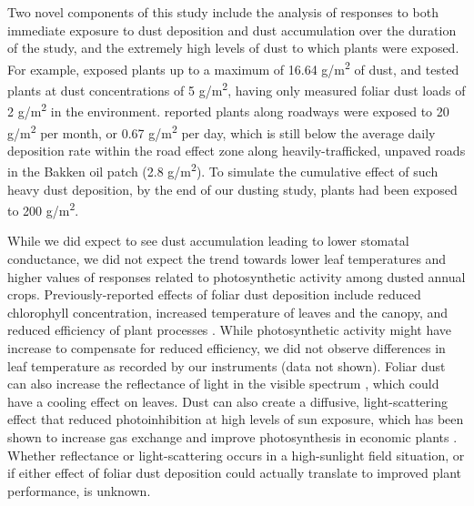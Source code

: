 \documentclass{svjour3}
\begin{document}
Two novel components of this study include the analysis of responses to both immediate exposure to dust deposition and dust accumulation over the duration of the study, and the extremely high levels of dust to which plants were exposed. 
For example, \citet{bao2015} exposed plants up to a maximum of 16.64 g/m\textsuperscript{2} of dust, and \citet{thompson1984} tested plants at dust concentrations of 5 g/m\textsuperscript{2}, having only measured foliar dust loads of 2 g/m\textsuperscript{2} in the environment. 
\citet{matsuki2016} reported plants along roadways were exposed to 20 g/m\textsuperscript{2} per month, or 0.67 g/m\textsuperscript{2} per day, which is still below the average daily deposition rate within the road effect zone along heavily-trafficked, unpaved roads in the Bakken oil patch (2.8 g/m\textsuperscript{2}). 
To simulate the cumulative effect of such heavy dust deposition, by the end of our dusting study, plants had been exposed to 200 g/m\textsuperscript{2}.

While we did expect to see dust accumulation leading to lower stomatal conductance, we did not expect the trend towards lower leaf temperatures and higher values of responses related to photosynthetic activity among dusted annual crops. 
Previously-reported effects of foliar dust deposition include reduced chlorophyll concentration, increased temperature of leaves and the canopy, and reduced efficiency of plant processes \citep{eller1977, ulrichs2008,zia-khan2014, sarma2017}. 
While photosynthetic activity might have increase to compensate for reduced efficiency, we did not observe differences in leaf temperature as recorded by our instruments (data not shown). 
Foliar dust can also increase the reflectance of light in the visible spectrum \citep{wu2016}, which could have a cooling effect on leaves. 
Dust can also create a diffusive, light-scattering effect that reduced photoinhibition at high levels of sun exposure, which has been shown to increase gas exchange and improve photosynthesis in economic plants \citep{jifon2003, kromdijk2016}. 
Whether reflectance or light-scattering occurs in a high-sunlight field situation, or if either effect of foliar dust deposition could actually translate to improved plant performance, is unknown. 
\end{document}
